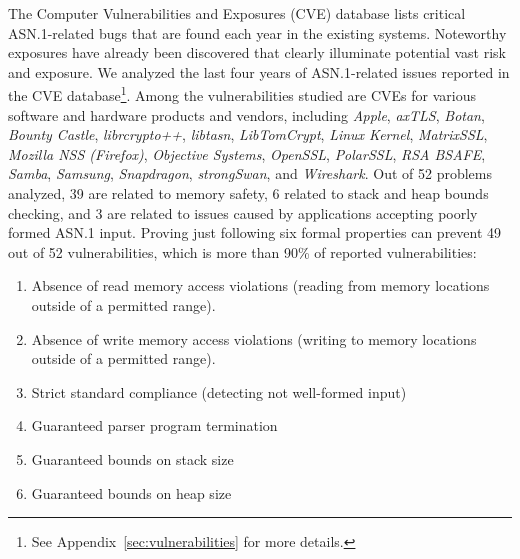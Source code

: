 \documentclass[10p,conference]{IEEEtran}
\begin{document}
The Computer Vulnerabilities and Exposures (CVE) database \cite{CVE}
lists critical ASN.1-related bugs that are found each year in the
existing systems. Noteworthy exposures have already been discovered
\cite{OpenSSLMemoryCorruption} that clearly illuminate potential vast
risk and exposure. We analyzed the last four years of ASN.1-related
issues reported in the CVE database\footnote{See Appendix~\ref{sec:vulnerabilities} for more
  details.}.  Among the vulnerabilities studied are CVEs for various
software and hardware products and vendors, including \textit{Apple},
\textit{axTLS}, \textit{Botan}, \textit{Bounty Castle},
\textit{librcrypto++}, \textit{libtasn}, \textit{LibTomCrypt},
\textit{Linux Kernel}, \textit{MatrixSSL}, \textit{Mozilla NSS
  (Firefox)}, \textit{Objective Systems}, \textit{OpenSSL},
\textit{PolarSSL}, \textit{RSA BSAFE}, \textit{Samba},
\textit{Samsung}, \textit{Snapdragon}, \textit{strongSwan}, and
\textit{Wireshark}.  Out of 52 problems analyzed, 39 are related to
memory safety, 6 related to stack and heap bounds checking, and 3 are
related to issues caused by applications accepting poorly formed ASN.1
input. Proving just following six formal properties can prevent 49 out of 52
vulnerabilities, which is more than 90\% of reported vulnerabilities:

\begin{enumerate}

\item Absence of read memory access violations (reading from memory locations outside of a permitted range).
\item Absence of write memory access violations (writing to memory locations outside of a permitted range).
\item Strict standard compliance (detecting not well-formed input)
\item Guaranteed parser program termination
\item Guaranteed bounds on stack size
\item Guaranteed bounds on heap size
\end{enumerate}
\end{document}
